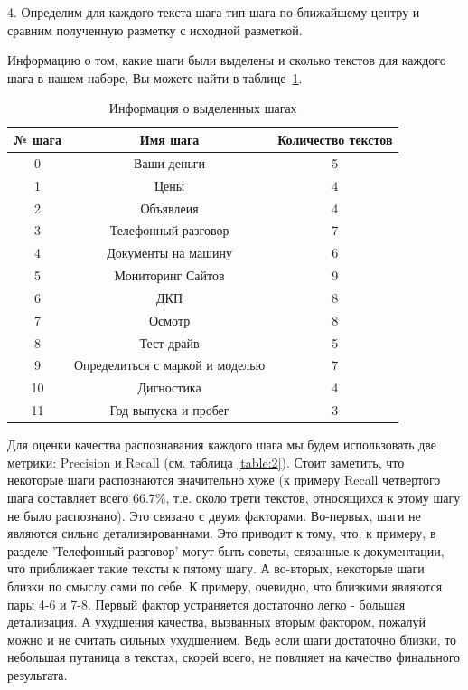 \documentclass[12pt]{article}
\begin{document}
4. Определим для каждого текста-шага тип шага по ближайшему центру и сравним полученную разметку с исходной разметкой.

Информацию о том, какие шаги были выделены и сколько текстов для каждого шага в нашем наборе, Вы можете найти в таблице~\ref{table:2.0}.

\begin{table}[h!]
\centering
\begin{tabular}{||c|c|c||} 
 \hline
 № шага & Имя шага &Количество текстов\\
 \hline
 0&  Ваши деньги&5\\ 
 1&  Цены&4  \\ 
 2&  Объявлеия&4  \\ 
 3&  Телефонный разговор&7  \\ 
  4&  Документы на машину&6  \\ 
 5&  Мониторинг Сайтов&9\\ 
 6&  ДКП&8  \\ 
 7&  Осмотр&8  \\ 
 8&  Тест-драйв&5  \\ 
 9&  Определиться с маркой и моделью&7  \\ 
 10&  Дигностика&4  \\ 
 11&  Год выпуска и пробег&3  \\ 
 \hline
\end{tabular}
\caption{Информация о выделенных шагах}
\label{table:2.0}
\end{table}

Для оценки качества распознавания каждого шага мы будем использовать две метрики: Precision и Recall (см. таблица \ref{table:2}). Стоит заметить, что некоторые шаги распознаются значительно хуже (к примеру Recall четвертого шага составляет всего 66.7$\%$, т.е. около трети текстов, относящихся к этому шагу не было распознано). Это связано с двумя факторами. Во-первых, шаги не являются сильно детализированнами. Это приводит к тому, что, к примеру, в разделе 'Телефонный разговор' могут быть советы, связанные к документации, что приближает такие тексты к пятому шагу. А во-вторых, некоторые шаги близки по смыслу сами по себе. К примеру, очевидно, что близкими являются пары 4-6 и 7-8.  Первый фактор устраняется достаточно легко - большая детализация. А ухудшения качества, вызванных вторым фактором, пожалуй можно и не считать сильных ухудшением. Ведь если шаги достаточно близки, то небольшая путаница в текстах, скорей всего, не повлияет на качество финального результата.
\end{document}
